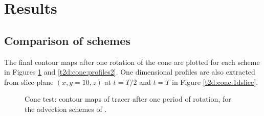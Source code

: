 \section{Results}

\subsection{Comparison of schemes}

The final contour maps after one rotation of the cone are plotted for each
scheme in Figures \ref{t2d:cone:profiles1} and \ref{t2d:cone:profiles2}.
One dimensional profiles are also extracted from slice plane $(x,y=10,z)$
at $t = T/2$ and $t = T$ in Figure \ref{t2d:cone:1dslice}.

\newpage

\begin{figure}[H]
\begin{minipage}[t]{0.50\textwidth}
 \centering
\end{minipage}%
\begin{minipage}[t]{0.50\textwidth}
 \centering
\end{minipage}
\begin{minipage}[t]{0.50\textwidth}
 \centering
\end{minipage}
\begin{minipage}[t]{0.50\textwidth}
 \centering
\end{minipage}
\begin{minipage}[t]{0.50\textwidth}
 \centering
\end{minipage}%
\begin{minipage}[t]{0.50\textwidth}
 \centering
\end{minipage}
\begin{minipage}[t]{0.50\textwidth}
 \centering
\end{minipage}%
\begin{minipage}[t]{0.50\textwidth}
 \centering
\end{minipage}
  \caption{Cone test: contour maps of tracer after one period of rotation, for the advection schemes of .}
 \label{t2d:cone:profiles1}
\end{figure}

